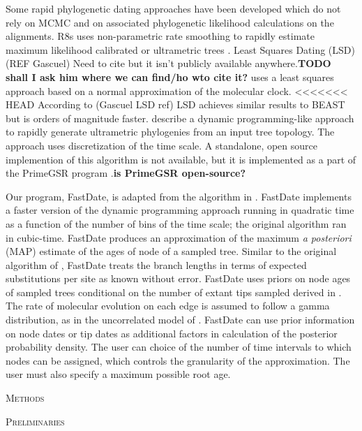 \documentclass{llncs}
\newcommand{\ejmcomment}[1]{{\color{green} #1}}
\renewcommand{\section}[1]{%
\bigskip
\begin{center}
\begin{Large}
\normalfont\scshape #1
\medskip
\end{Large}
\end{center}}
\begin{document}
Some rapid phylogenetic dating approaches have been developed which do not rely on MCMC and on associated phylogenetic likelihood calculations on the alignments.\@
R8s uses non-parametric rate smoothing to rapidly estimate 
maximum likelihood calibrated or ultrametric trees \citep{Sanderson2003}.
Least Squares Dating (LSD) (REF Gascuel) 
\ejmcomment{Need to cite but it isn't publicly available anywhere.}{\bf TODO shall I ask him where we can find/ho wto cite it?}
uses a least squares approach based on a normal approximation of the molecular clock.
<<<<<<< HEAD
According to (Gascuel LSD ref) LSD achieves similar results to BEAST but is orders of magnitude faster. 
\cite{Akerborg2008} describe a dynamic programming-like approach to 
rapidly generate ultrametric phylogenies from an input tree topology.
The approach uses discretization of the time scale.
A standalone, open source implemention of this algorithm is not available,
but it is implemented as a part of the PrimeGSR program \citep{Akerborg2009}.{\bf is PrimeGSR open-source?}


Our program, FastDate, is adapted from the algorithm in \cite{Akerborg2008}.
FastDate implements a faster version of the dynamic programming approach running 
in quadratic time as a function of the number of bins of the time scale;
the original algorithm ran in cubic-time.
FastDate produces an approximation of the maximum {\em a posteriori} (MAP)
estimate of the ages of node of a sampled tree.
Similar to the original algorithm of \cite{Akerborg2008}, FastDate treats
the branch lengths in terms of expected substitutions per site as known without error.
FastDate uses priors on node ages of sampled trees conditional on the 
number of extant tips sampled derived in \cite{Stadler2010}.
The rate of molecular evolution on each edge is assumed to follow a 
gamma distribution, as in the uncorrelated model of \cite{BEASTREF-FOR-THIS-MODEL}.
FastDate can use prior information on node dates or tip dates as additional
factors in calculation of the posterior probability density.
The user can choice of the number of time intervals to which 
nodes can be assigned, which controls the granularity of the approximation.
The user must also specify a maximum possible root age.


\section{Methods}

\section {Preliminaries}
%
%
\end{document}
